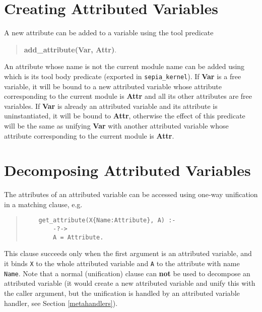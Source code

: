 \section{Creating Attributed Variables}
A new attribute can be added to a variable
using the tool predicate
\begin{quote}
{\bf add_attribute(Var, Attr)}.
\end{quote}
An attribute whose name is not the current module name
can be added using  which is its tool
body predicate (exported in {\tt sepia_kernel}).
If {\bf Var} is a free variable, it will be bound to a new attributed variable
whose attribute corresponding to the current module is
{\bf Attr} and all its other attributes are free variables.
If {\bf Var} is already an attributed variable and its attribute is uninstantiated,
it will be bound to {\bf Attr}, otherwise the effect of this predicate
will be the same as unifying {\bf Var} with another attributed variable
whose attribute corresponding to the current module is 
{\bf Attr}.

\section{Decomposing Attributed Variables}
The attributes of an attributed variable can be accessed using one-way
unification in a matching clause, e.g.
\begin{quote}
\begin{verbatim}
    get_attribute(X{Name:Attribute}, A) :-
        -?->
        A = Attribute.
\end{verbatim}
\end{quote}
This clause succeeds only when the first argument is an attributed variable,
and it binds
{\tt X} to the whole attributed variable and {\tt A} to the attribute
with name {\tt Name}.
Note that a normal (unification) clause can {\bf not} be used to decompose
an attributed variable (it would create a new attributed variable and unify this with the caller
argument, but the unification is handled by an attributed variable handler, see
Section \ref{metahandlers}).

